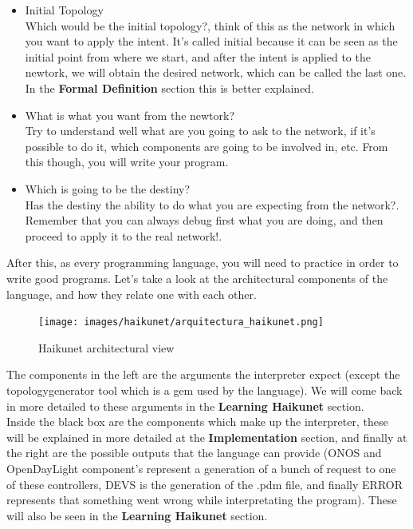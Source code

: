 \begin{itemize}
\item Initial Topology\\
Which would be the initial topology?, think of this as the network in which you want to apply the intent. It's called initial because it can be seen as the initial point from where we start, and after the intent is applied to the newtork, we will obtain the desired network, which can be called the last one. In the \textbf{Formal Definition} section this is better explained.
\item What is what you want from the newtork?\\
Try to understand well what are you going to ask to the network, if it's possible to do it, which components are going to be involved in, etc. From this though, you will write your program.
\item Which is going to be the destiny?\\
Has the destiny the ability to do what you are expecting from the network?. Remember that you can always debug first what you are doing, and then proceed to apply it to the real network!.
\end{itemize}

After this, as every programming language, you will need to practice in order to write good programs. Let's take a look at the architectural components of the language, and how they relate one with each other.

\begin{figure}[H]
\centering
\texttt{[image: images/haikunet/arquitectura\_haikunet.png]}
\caption{Haikunet architectural view}
\end{figure}

The components in the left are the arguments the interpreter expect (except the topologygenerator tool which is a gem used by the language). We will come back in more detailed to these arguments in the \textbf{Learning Haikunet} section.\\
Inside the black box are the components which make up the interpreter, these will be explained in more detailed at the \textbf{Implementation} section, and finally at the right are the possible outputs that the language can provide (ONOS and OpenDayLight component's represent a generation of a bunch of request to one of these controllers, DEVS is the generation of the .pdm file, and finally ERROR represents that something went wrong while interpretating the program). These will also be seen in the \textbf{Learning Haikunet} section.\\

